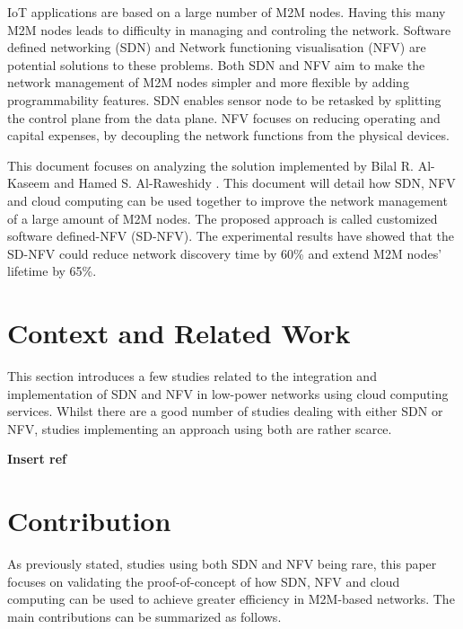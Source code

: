 \documentclass[10pt,journal,compsoc]{IEEEtran}
\begin{document}
IoT applications are based on a large number of M2M nodes. 
Having this many M2M nodes leads to difficulty in 
managing and controling the network. Software defined networking (SDN) 
and Network functioning visualisation (NFV) are potential solutions to 
these problems. Both SDN and NFV aim to make the network management 
of M2M nodes simpler and more flexible by adding programmability features. 
SDN enables sensor node to be retasked by splitting the control plane from 
the data plane. NFV focuses on reducing operating and capital expenses, 
by decoupling the network functions from the physical devices. 

This document focuses on analyzing the solution implemented by Bilal 
R. Al-Kaseem and Hamed S. Al-Raweshidy \cite{main}. 
This document will detail how SDN, NFV and cloud computing can be used 
together to improve the network management of a large amount of M2M nodes. 
The proposed approach is called customized software defined-NFV (SD-NFV). 
The experimental results have showed that the SD-NFV could reduce 
network discovery time by 60\% and extend M2M nodes' lifetime by 65\%.

\section{Context and Related Work}\label{sec:context}

This section introduces a few studies related to the integration and 
implementation of SDN and NFV in low-power networks using cloud 
computing services. Whilst there are a good number of studies dealing with 
either SDN or NFV, studies implementing an approach using both are 
rather scarce.

\textbf{Insert ref}

\section{Contribution}\label{sec:contribution}

As previously stated, studies using both SDN and NFV being rare, this paper 
focuses on validating the proof-of-concept of how SDN, NFV and cloud 
computing can be used to achieve greater efficiency in M2M-based networks.
The main contributions can be summarized as follows.
\end{document}
